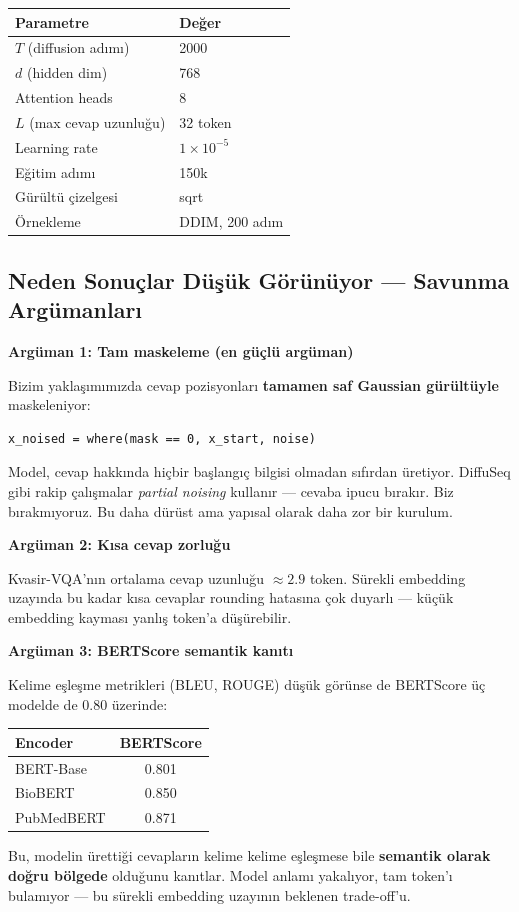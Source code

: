 \documentclass[12pt, a4paper]{article}
\begin{document}
\begin{center}
\begin{tabular}{ll}
  \toprule
  Parametre & Değer \\
  \midrule
  $T$ (diffusion adımı) & 2000 \\
  $d$ (hidden dim) & 768 \\
  Attention heads & 8 \\
  $L$ (max cevap uzunluğu) & 32 token \\
  Learning rate & $1 \times 10^{-5}$ \\
  Eğitim adımı & 150k \\
  Gürültü çizelgesi & sqrt \\
  Örnekleme & DDIM, 200 adım \\
  \bottomrule
\end{tabular}
\end{center}

\subsection{Neden Sonuçlar Düşük Görünüyor — Savunma Argümanları}

\textbf{Argüman 1: Tam maskeleme (en güçlü argüman)}

Bizim yaklaşımımızda cevap pozisyonları \textbf{tamamen saf Gaussian gürültüyle} maskeleniyor:
\begin{verbatim}
x_noised = where(mask == 0, x_start, noise)
\end{verbatim}
Model, cevap hakkında hiçbir başlangıç bilgisi olmadan sıfırdan üretiyor.
DiffuSeq gibi rakip çalışmalar \textit{partial noising} kullanır — cevaba ipucu bırakır.
Biz bırakmıyoruz. Bu daha dürüst ama yapısal olarak daha zor bir kurulum.

\textbf{Argüman 2: Kısa cevap zorluğu}

Kvasir-VQA'nın ortalama cevap uzunluğu $\approx 2.9$ token. Sürekli embedding uzayında bu kadar kısa cevaplar rounding hatasına çok duyarlı — küçük embedding kayması yanlış token'a düşürebilir.

\textbf{Argüman 3: BERTScore semantik kanıtı}

Kelime eşleşme metrikleri (BLEU, ROUGE) düşük görünse de BERTScore üç modelde de 0.80 üzerinde:
\begin{center}
\begin{tabular}{lc}
  \toprule
  Encoder & BERTScore \\
  \midrule
  BERT-Base  & 0.801 \\
  BioBERT    & 0.850 \\
  PubMedBERT & 0.871 \\
  \bottomrule
\end{tabular}
\end{center}
Bu, modelin ürettiği cevapların kelime kelime eşleşmese bile \textbf{semantik olarak doğru bölgede} olduğunu kanıtlar. Model anlamı yakalıyor, tam token'ı bulamıyor — bu sürekli embedding uzayının beklenen trade-off'u.
\end{document}
